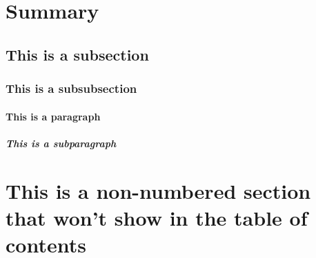 \section{Summary}\label{summary}
\subsection{This is a subsection}
\subsubsection{This is a subsubsection}
\paragraph{This is a paragraph}
\subparagraph{This is a subparagraph}
\section*{This is a non-numbered section that won't show in the table of contents}